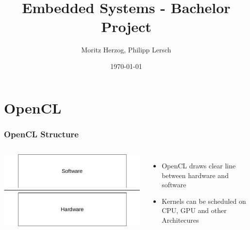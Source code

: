 \documentclass{beamer}
\title{Embedded Systems - Bachelor Project}
\author{Moritz Herzog, Philipp Lersch}
\date{\today}
\begin{document}
\maketitle


\section{OpenCL}
\begin{frame}
    \frametitle{OpenCL Structure}
    \begin{columns}
        \includegraphics[width=\textwidth]{res/HardwareSoftwareLayer.jpg}
        \begin{itemize}
            \item OpenCL draws clear line between hardware and software
            \item Kernels can be scheduled on CPU, GPU and other Architecures
        \end{itemize}
    \end{columns}
\end{frame}
\end{document}
